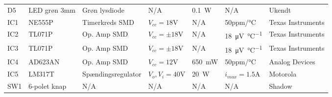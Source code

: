 \begin{table}[h!]
\begin{threeparttable}
\begin{tabular}{ l l l l l l l }
D5 & LED grøn 3mm & Grøn lysdiode & N/A & \SI{0.1}{\watt} & N/A & Ukendt \\
IC1 & NE555P & Timerkreds SMD & $V_{cc}= 18 \si{\volt}$ & N/A & 50ppm/\si{\celsius} & Texas Instruments \\
IC2 & TL071P & Op. Amp SMD & $V_{cc}=\pm 18 \si{\volt}$ & N/A & \SI{18}{\micro\volt\per\celsius} & Texas Instruments \\
IC3 & TL071P & Op. Amp SMD & $V_{cc}=\pm 18 \si{\volt}$ & N/A & \SI{18}{\micro\volt\per\celsius} & Texas Instruments \\
IC4 & AD623AN & Op. Amp SMD & $V_{cc} = 12 \si{\volt}$ & \SI{650}{\milli\watt} & 50ppm/\si{\celsius} & Analog Devices \\
IC5 & LM317T & Spændingsregulator & $V_{o} , V_{i} = 40 \si{\volt}$ & \SI{20}{\watt} & $i_{max} = 1.5 \si{\ampere}$ & Motorola \\
SW1 & 6-polet knap & N/A & N/A & N/A & N/A & Shadow \\

\hline
\bottomrule
\end{tabular}
\end{threeparttable}
\end{table} 